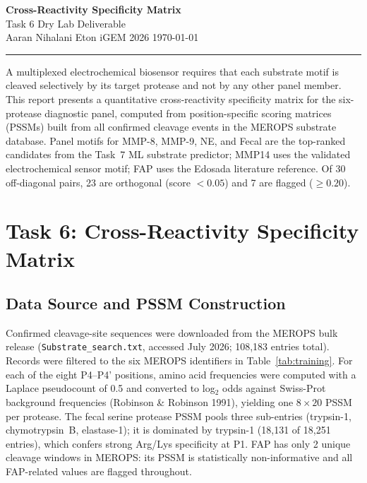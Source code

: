 \documentclass[10pt,a4paper]{article}
\begin{document}
\begin{center}
  {\LARGE\bfseries Cross-Reactivity Specificity Matrix}\\[0.15em]
  {\normalsize Task 6 \textbullet{} Dry Lab Deliverable}\\[0.08em]
  {\small Aaran Nihalani \textbullet{} Eton iGEM 2026 \textbullet{} \today}
\end{center}
\vspace{0.3em}\hrule\vspace{0.5em}

A multiplexed electrochemical biosensor requires that each substrate motif is cleaved
selectively by its target protease and not by any other panel member. This report
presents a quantitative cross-reactivity specificity matrix for the six-protease diagnostic
panel, computed from position-specific scoring matrices (PSSMs) built from all confirmed
cleavage events in the MEROPS substrate database. Panel motifs for MMP-8, MMP-9, NE,
and Fecal are the top-ranked candidates from the Task~7 ML substrate predictor; MMP14
uses the validated electrochemical sensor motif; FAP uses the Edosada literature reference.
Of 30 off-diagonal pairs, 23 are orthogonal (score $< 0.05$) and 7 are flagged
($\geq 0.20$).

\section{Task 6: Cross-Reactivity Specificity Matrix}

\subsection{Data Source and PSSM Construction}

Confirmed cleavage-site sequences were downloaded from the MEROPS bulk release
(\texttt{Substrate\_search.txt}, accessed July 2026; 108,183 entries total). Records were
filtered to the six MEROPS identifiers in Table~\ref{tab:training}. For each of the eight
P4--P4' positions, amino acid frequencies were computed with a Laplace pseudocount of 0.5
and converted to log$_2$ odds against Swiss-Prot background frequencies (Robinson \&
Robinson 1991), yielding one $8 \times 20$ PSSM per protease. The fecal serine protease
PSSM pools three sub-entries (trypsin-1, chymotrypsin~B, elastase-1); it is dominated by
trypsin-1 (18,131 of 18,251 entries), which confers strong Arg/Lys specificity at P1.
FAP has only 2 unique cleavage windows in MEROPS: its PSSM is statistically non-informative
and all FAP-related values are flagged throughout.
\end{document}
